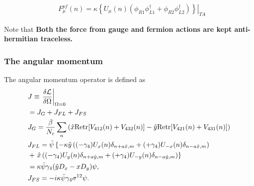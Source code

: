 \begin{equation}
\begin{split}
&F^{pf}_{\mu}(n)=\kappa \left.\left\{U_{\mu}(n)\left(\phi _{R1}\phi _{L1}^{\dagger}+\phi _{R2}\phi _{L2}^{\dagger}\right)\right\}\right|_{TA}
\end{split}
\end{equation}

Note that \textbf{Both the force from gauge and fermion actions are kept anti-hermitian traceless.}

\subsubsection{\label{sec:AngularMomentum}The angular momentum}

The angular momentum operator is defined as
\begin{equation}
\begin{split}
&J\equiv \left.\frac{\delta \mathcal{L}}{\delta \Omega}\right|_{\Omega = 0}\\
&=J_G+J_{FL}+J_{FS}\\
&J_G=\frac{\beta}{N_c}\sum _n \left(\hat{x}{\rm Retr}[V_{412}(n)+V_{432}(n)]-\hat{y}{\rm Retr}[V_{421}(n)+V_{431}(n)]\right)\\
&J_{FL}=\bar{\psi}\left\{-\kappa \hat{y}\left((-\gamma _4)U_{x}(n)\delta _{n+a\hat{x},m}+(+\gamma _4)U_{-x}(n)\delta _{n-a\hat{x},m}\right)\right.\\
&+\left.\hat{x}\left((-\gamma _4)U_{y}(n)\delta _{n+a\hat{y},m}+(+\gamma _4)U_{-y}(n)\delta _{n-a\hat{y},m}\right)\right\}\\
&=\kappa \bar{\psi}\gamma _4 (\hat{y}D_x-xD_y)\psi,\\
&J_{FS}=-i\kappa \bar{\psi} \gamma _4 \sigma ^{12} \psi.\\
\end{split}
\end{equation}

